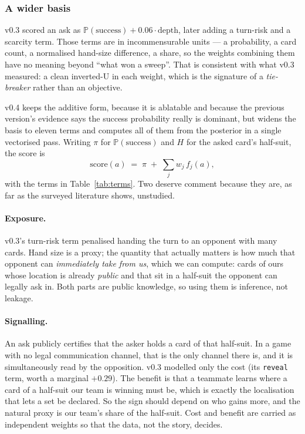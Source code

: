 \documentclass[11pt,letterpaper]{article}
\newcommand{\Prob}{\ensuremath{\mathbb{P}}}
\begin{document}
\subsubsection{A wider basis}

v0.3 scored an ask as $\Prob(\text{success}) + 0.06 \cdot \text{depth}$, later
adding a turn-risk and a scarcity term. Those terms are in incommensurable
units --- a probability, a card count, a normalised hand-size difference, a
share, so the weights combining them have no meaning beyond ``what won a
sweep''. That is consistent with what v0.3 measured: a clean inverted-U in each
weight, which is the signature of a \emph{tie-breaker} rather than an objective.

v0.4 keeps the additive form, because it is ablatable and because the previous
version's evidence says the success probability really is dominant, but widens
the basis to eleven terms and computes all of them from the posterior in a
single vectorised pass. Writing $\pi$ for $\Prob(\text{success})$ and $H$ for
the asked card's half-suit, the score is
\begin{equation}
\text{score}(a) \;=\; \pi \;+\; \sum_{j} w_j\, f_j(a),
\label{eq:objective}
\end{equation}
with the terms in Table~\ref{tab:terms}. Two deserve comment because they are,
as far as the surveyed literature shows, unstudied.

\paragraph{Exposure.} v0.3's turn-risk term penalised handing the turn to an
opponent with many cards. Hand size is a proxy; the quantity that actually
matters is how much that opponent can \emph{immediately take from us}, which we
can compute: cards of ours whose location is already \emph{public} and that sit
in a half-suit the opponent can legally ask in. Both parts are public knowledge,
so using them is inference, not leakage.

\paragraph{Signalling.} An ask publicly certifies that the asker holds a card of
that half-suit. In a game with no legal communication channel, that is the only
channel there is, and it is simultaneously read by the opposition. v0.3
modelled only the cost (its \texttt{reveal} term, worth a marginal $+0.29$). The
benefit is that a teammate learns where a card of a half-suit our team is
winning must be, which is exactly the localisation that lets a set be declared.
So the sign should depend on who gains more, and the natural proxy is our team's
share of the half-suit. Cost and benefit are carried as independent weights so
that the data, not the story, decides.
\end{document}
